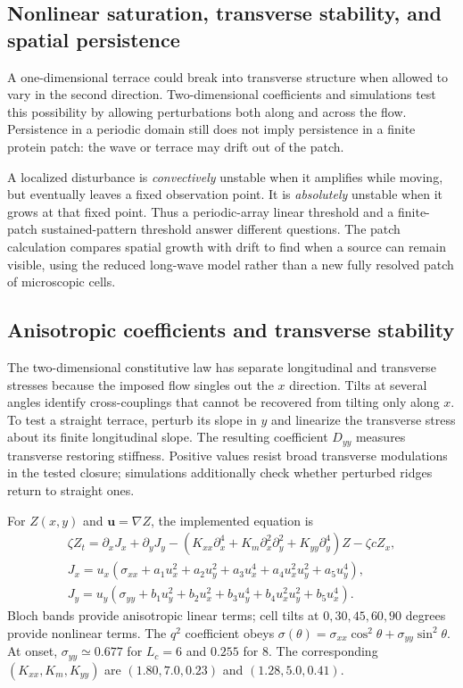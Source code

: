 \subsection{Nonlinear saturation, transverse stability, and spatial persistence}
A one-dimensional terrace could break into transverse structure when allowed to vary in the second direction. Two-dimensional coefficients and simulations test this possibility by allowing perturbations both along and across the flow. Persistence in a periodic domain still does not imply persistence in a finite protein patch: the wave or terrace may drift out of the patch.

A localized disturbance is \emph{convectively} unstable when it amplifies while moving, but eventually leaves a fixed observation point. It is \emph{absolutely} unstable when it grows at that fixed point. Thus a periodic-array linear threshold and a finite-patch sustained-pattern threshold answer different questions. The patch calculation compares spatial growth with drift to find when a source can remain visible, using the reduced long-wave model rather than a new fully resolved patch of microscopic cells.


\subsection{Anisotropic coefficients and transverse stability}


The two-dimensional constitutive law has separate longitudinal and transverse stresses because the imposed flow singles out the $x$ direction. Tilts at several angles identify cross-couplings that cannot be recovered from tilting only along $x$. To test a straight terrace, perturb its slope in $y$ and linearize the transverse stress about its finite longitudinal slope. The resulting coefficient $D_{yy}$ measures transverse restoring stiffness. Positive values resist broad transverse modulations in the tested closure; simulations additionally check whether perturbed ridges return to straight ones.


For $Z(x,y)$ and $\bm u=\nabla Z$, the implemented equation is
\begin{multline}
\zeta Z_t=\partial_xJ_x+\partial_yJ_y-
(K_{xx}\partial_x^4+K_m\partial_x^2\partial_y^2+K_{yy}\partial_y^4)Z-\zeta cZ_x,\\
J_x=u_x(\sigma_{xx}+a_1u_x^2+a_2u_y^2+a_3u_x^4+a_4u_x^2u_y^2+a_5u_y^4),\\
J_y=u_y(\sigma_{yy}+b_1u_y^2+b_2u_x^2+b_3u_y^4+b_4u_x^2u_y^2+b_5u_x^4).
\end{multline}
Bloch bands provide anisotropic linear terms; cell tilts at $0,30,45,60,90$ degrees provide nonlinear terms. The $q^2$ coefficient obeys $\sigma(\theta)=\sigma_{xx}\cos^2\theta+\sigma_{yy}\sin^2\theta$. At onset, $\sigma_{yy}\simeq0.677$ for $L_c=6$ and $0.255$ for $8$. The corresponding $(K_{xx},K_m,K_{yy})$ are $(1.80,7.0,0.23)$ and $(1.28,5.0,0.41)$.

